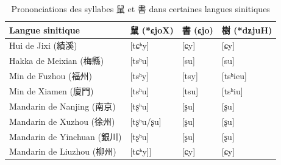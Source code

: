 \documentclass{scrbook}
\newcounter{c}[subsubsection]
\begin{document}
\begin{sloppypar}
\begin{table}[htbp]
  \centering

    \begin{tabular}{llll}
    \toprule
    Langue sinitique & 鼠 (*ɕjoX) & 書 (ɕjo) & 樹 (*dʑjuH) \\
    \midrule
    Hui de Jixi (績溪) & [tɕʰy] & [ɕy]  & [ɕy] \\
    Hakka de Meixian (梅縣) & [tsʰu] & [su]  & [su] \\
    Min de Fuzhou (福州) & \cellcolor[rgb]{ .851,  .851,  .851}[tsʰy] & \cellcolor[rgb]{ .851,  .851,  .851}[tsy] & \cellcolor[rgb]{ .851,  .851,  .851}[tsʰieu] \\
    Min de Xiamen (廈門) & \cellcolor[rgb]{ .851,  .851,  .851}[tsʰu] & \cellcolor[rgb]{ .851,  .851,  .851}[tsu] & \cellcolor[rgb]{ .851,  .851,  .851}[tsʰiu] \\
    Mandarin de Nanjing (南京) & [tʂʰu] & [ʂu]  & [ʂu] \\
    Mandarin de Xuzhou (徐州) & [tʂʰu/ʂu] & [ʂu]  & [ʂu] \\
    Mandarin de Yinchuan (銀川) & [tʂʰu] & [ʂu]  & [ʂu] \\
    Mandarin de Liuzhou (柳州) & [tɕʰy]] & [ɕy]  & [ɕy] \\
    \bottomrule
    \end{tabular}%
  \caption{Prononciations des syllabes 鼠 et 書 dans certaines langues sinitiques}
  \label{tab:exemple_shu}%
\end{table}%


\end{sloppypar}
\end{document}
